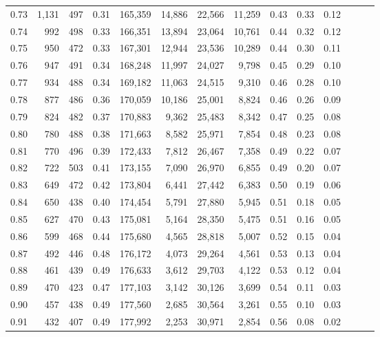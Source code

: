 \begin{tabular}{rrrrrrrrrrrrrr}
0.73 &  1,131 &  497 &  0.31 &  165,359 &   14,886 &  22,566 &  11,259 &  0.43 &  0.33 &      0.12 \\
0.74 &    992 &  498 &  0.33 &  166,351 &   13,894 &  23,064 &  10,761 &  0.44 &  0.32 &      0.12 \\
0.75 &    950 &  472 &  0.33 &  167,301 &   12,944 &  23,536 &  10,289 &  0.44 &  0.30 &      0.11 \\
0.76 &    947 &  491 &  0.34 &  168,248 &   11,997 &  24,027 &   9,798 &  0.45 &  0.29 &      0.10 \\
0.77 &    934 &  488 &  0.34 &  169,182 &   11,063 &  24,515 &   9,310 &  0.46 &  0.28 &      0.10 \\
0.78 &    877 &  486 &  0.36 &  170,059 &   10,186 &  25,001 &   8,824 &  0.46 &  0.26 &      0.09 \\
0.79 &    824 &  482 &  0.37 &  170,883 &    9,362 &  25,483 &   8,342 &  0.47 &  0.25 &      0.08 \\
0.80 &    780 &  488 &  0.38 &  171,663 &    8,582 &  25,971 &   7,854 &  0.48 &  0.23 &      0.08 \\
0.81 &    770 &  496 &  0.39 &  172,433 &    7,812 &  26,467 &   7,358 &  0.49 &  0.22 &      0.07 \\
0.82 &    722 &  503 &  0.41 &  173,155 &    7,090 &  26,970 &   6,855 &  0.49 &  0.20 &      0.07 \\
0.83 &    649 &  472 &  0.42 &  173,804 &    6,441 &  27,442 &   6,383 &  0.50 &  0.19 &      0.06 \\
0.84 &    650 &  438 &  0.40 &  174,454 &    5,791 &  27,880 &   5,945 &  0.51 &  0.18 &      0.05 \\
0.85 &    627 &  470 &  0.43 &  175,081 &    5,164 &  28,350 &   5,475 &  0.51 &  0.16 &      0.05 \\
0.86 &    599 &  468 &  0.44 &  175,680 &    4,565 &  28,818 &   5,007 &  0.52 &  0.15 &      0.04 \\
0.87 &    492 &  446 &  0.48 &  176,172 &    4,073 &  29,264 &   4,561 &  0.53 &  0.13 &      0.04 \\
0.88 &    461 &  439 &  0.49 &  176,633 &    3,612 &  29,703 &   4,122 &  0.53 &  0.12 &      0.04 \\
0.89 &    470 &  423 &  0.47 &  177,103 &    3,142 &  30,126 &   3,699 &  0.54 &  0.11 &      0.03 \\
0.90 &    457 &  438 &  0.49 &  177,560 &    2,685 &  30,564 &   3,261 &  0.55 &  0.10 &      0.03 \\
0.91 &    432 &  407 &  0.49 &  177,992 &    2,253 &  30,971 &   2,854 &  0.56 &  0.08 &      0.02 \\

\end{tabular}
